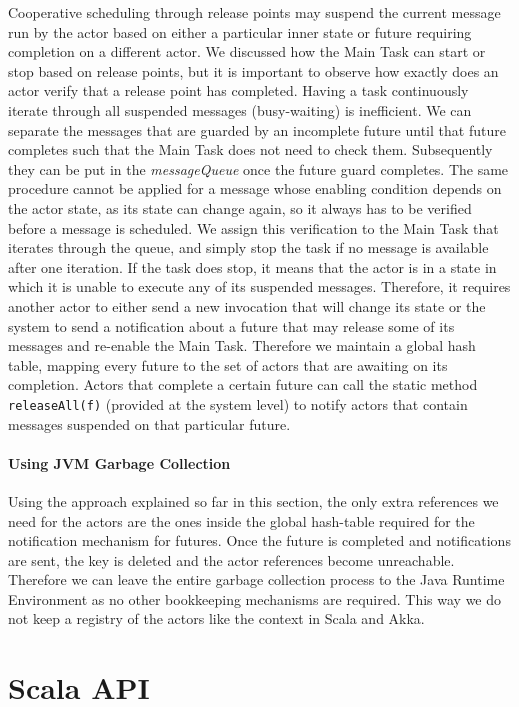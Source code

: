 Cooperative scheduling through release points may suspend the current message run by the actor based on either a particular inner state or future requiring completion on a different actor. We discussed how the Main Task can start or stop based on release points, but it is important to observe how exactly does an actor verify that a release point has completed. Having a task continuously iterate through all suspended messages (busy-waiting) is inefficient. We can separate the messages that are guarded by an incomplete future until that future completes such that the Main Task does not need to check them. Subsequently they can be put in the \textit{messageQueue} once the future guard completes. 
The same procedure cannot be applied for a message whose enabling condition depends on the actor state, as its state can change again, so it always has to be verified before a message is scheduled. We assign this verification to the Main Task that iterates through the queue, and simply stop the task if no message is available after one iteration. If the task does stop, it means that the actor is in a state in which it is unable to execute any of its suspended messages. Therefore, it requires another actor to either send a new invocation that will change its state or the system to send a notification about a future that may release some of its messages and re-enable the Main Task. 
Therefore we maintain a global hash table, mapping every future to the set of actors that are awaiting on its completion. 
Actors that complete a certain future can call the static method \lstinline|releaseAll(f)| (provided at the system level) to notify actors that contain messages suspended on that particular future. 
 
\paragraph{Using JVM Garbage Collection}
Using the approach explained so far in this section, the only extra references we need for the actors are the ones inside the global hash-table required for the notification mechanism for futures. Once the future is completed and notifications are sent, the key is deleted and the actor references become unreachable. Therefore we can leave the entire garbage collection process to the Java Runtime Environment as no other bookkeeping mechanisms are required. This way we do not keep a registry of the actors like the {\ttfamily context} in Scala and Akka.

\section{Scala API}

